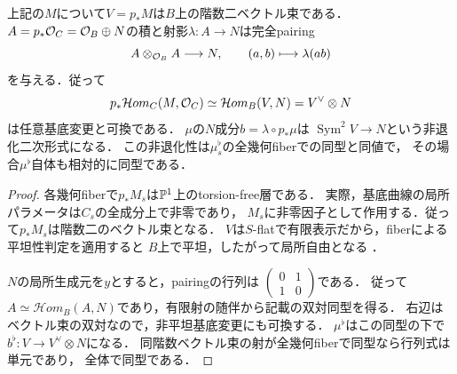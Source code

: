 \begin{lemma}[相対直像の局所自由性と双対]
\label{lem:qa-tf-frobenius-duality}
上記の$M$について$V=p_*M$は$B$上の階数二ベクトル束である．
$A=p_*\mathcal O_C=\mathcal O_B\oplus N$の積と射影$\lambda:A\to N$は完全pairing
\[
 A\otimes_{\mathcal O_B}A\longrightarrow N,\qquad
 (a,b)\longmapsto\lambda(ab)
\]
を与える．従って
\begin{equation}
 p_*\mathcal H om_C(M,\mathcal O_C)
   \simeq\mathcal H om_B(V,N)=V^\vee\otimes N
 \label{eq:qa-tf-frobenius-dual}
\end{equation}
は任意基底変更と可換である．
$\mu$の$N$成分$b=\lambda\circ p_*\mu$は
$\operatorname{Sym}^2V\to N$という非退化二次形式になる．
この非退化性は$\mu_s^\flat$の全幾何fiberでの同型と同値で，
その場合$\mu^\flat$自体も相対的に同型である．
\end{lemma}
\begin{proof}
各幾何fiberで$p_*M_s$は$\mathbb P^1$上のtorsion-free層である．
実際，基底曲線の局所パラメータは$C_s$の全成分上で非零であり，
$M_s$に非零因子として作用する．従って$p_*M_s$は階数二のベクトル束となる．
$V$は$S$-flatで有限表示だから，fiberによる平坦性判定を適用すると
$B$上で平坦，したがって局所自由となる
\cite[Theorem~76.23.3, Tag~05X0]{StacksCoherentSheaves}．

$N$の局所生成元を$y$とすると，pairingの行列は
$\left(\begin{smallmatrix}0&1\\1&0\end{smallmatrix}\right)$である．
従って$A\simeq\mathcal H om_B(A,N)$であり，有限射の随伴から記載の双対同型を得る．
右辺はベクトル束の双対なので，非平坦基底変更にも可換する．
$\mu^\flat$はこの同型の下で$b^\flat:V\to V^\vee\otimes N$になる．
同階数ベクトル束の射が全幾何fiberで同型なら行列式は単元であり，
全体で同型である．
\end{proof}

